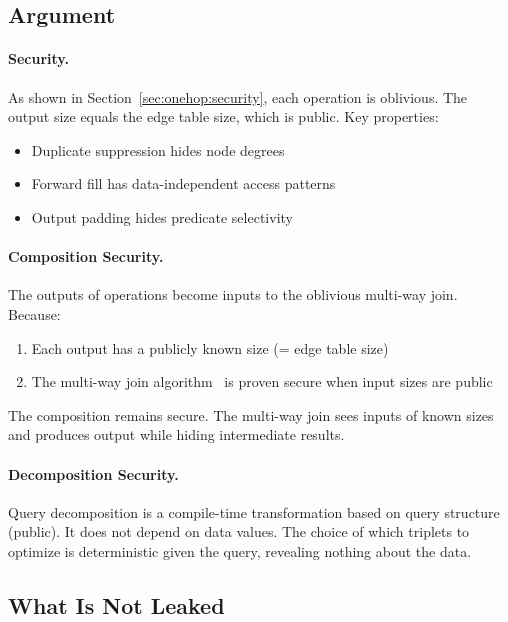 \subsection{Argument}
\label{sec:security:argument}

\paragraph{\onehop Security.}
As shown in Section~\ref{sec:onehop:security}, each \onehop operation is oblivious. The output size equals the edge table size, which is public. Key properties:
\begin{itemize}
    \item Duplicate suppression hides node degrees
    \item Forward fill has data-independent access patterns
    \item Output padding hides predicate selectivity
\end{itemize}

\paragraph{Composition Security.}
The outputs of \onehop operations become inputs to the oblivious multi-way join. Because:
\begin{enumerate}
    \item Each \onehop output has a publicly known size (= edge table size)
    \item The multi-way join algorithm~\cite{ruidi2025oblivious} is proven secure when input sizes are public
\end{enumerate}
The composition remains secure. The multi-way join sees inputs of known sizes and produces output while hiding intermediate results.

\paragraph{Decomposition Security.}
Query decomposition is a compile-time transformation based on query structure (public). It does not depend on data values. The choice of which triplets to optimize is deterministic given the query, revealing nothing about the data.

\subsection{What Is Not Leaked}
\label{sec:security:notleaked}

